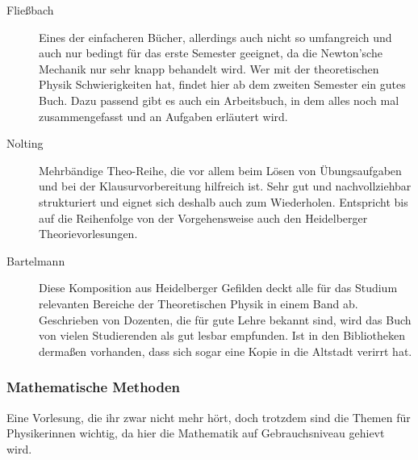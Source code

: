 \begin{description}
\item[Fließbach]{
		Eines der einfacheren Bücher, allerdings auch nicht so umfangreich und auch nur bedingt für das erste Semester geeignet, da die Newton'sche Mechanik nur sehr knapp behandelt wird. Wer mit der theoretischen Physik Schwierigkeiten hat, findet hier ab dem zweiten Semester ein gutes Buch. Dazu passend gibt es auch ein Arbeitsbuch, in dem alles noch mal zusammengefasst und an Aufgaben erläutert wird.}

\item[Nolting]{
		Mehrbändige Theo-Reihe, die vor allem beim Lösen von Übungsaufgaben und bei der Klausurvorbereitung hilfreich ist. Sehr gut und nachvollziehbar strukturiert und eignet sich deshalb auch zum Wiederholen. Entspricht bis auf die Reihenfolge von der Vorgehensweise auch den Heidelberger Theorievorlesungen.}

\item[Bartelmann]{
		Diese Komposition aus Heidelberger Gefilden deckt alle für das Studium relevanten Bereiche der Theoretischen Physik in einem Band ab. Geschrieben von Dozenten, die für gute Lehre bekannt sind, wird das Buch von vielen Studierenden als gut lesbar empfunden. Ist in den Bibliotheken dermaßen vorhanden, dass sich sogar eine Kopie in die Altstadt verirrt hat.}
\end{description}

\vspace{-4mm}

\subsubsection{Mathematische Methoden}

Eine Vorlesung, die ihr zwar nicht mehr hört, doch trotzdem sind die Themen für Physikerinnen wichtig, da hier die Mathematik auf Gebrauchsniveau gehievt wird.

